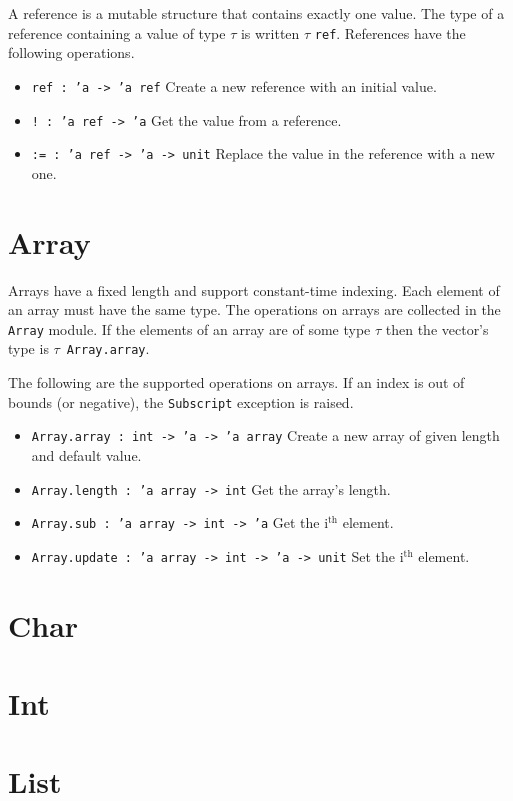 \documentclass[12pt,a4paper]{book}
\begin{document}
A reference is a mutable structure that contains exactly one value. The type of a reference containing a value of type $\tau$ is written $\tau$ \texttt{ref}.
References have the following operations.
\begin{itemize}
\item
\texttt{ref : 'a -> 'a ref} Create a new reference with an initial value.
\item
\texttt{! : 'a ref -> 'a} Get the value from a reference.
\item
\texttt{:= : 'a ref -> 'a -> unit} Replace the value in the reference with a new one.
\end{itemize}


\section{Array}

Arrays have a fixed length and support constant-time indexing. Each element of an array must have the same type. The operations on arrays are collected in the \texttt{Array} module. If the elements of an array are of some type $\tau$ then the vector's type is $\tau$\ \texttt{Array.array}.

The following are the supported operations on arrays. If an index is out of bounds (or negative), the \texttt{Subscript} exception is raised.
\begin{itemize}
\item \texttt{Array.array : int -> 'a -> 'a array} Create a new array of given length and default value.
\item \texttt{Array.length : 'a array -> int} Get the array's length.
\item \texttt{Array.sub : 'a array -> int -> 'a} Get the i$^\textrm{th}$ element.
\item \texttt{Array.update : 'a array -> int -> 'a -> unit} Set the i$^\textrm{th}$ element.
\end{itemize}

\section{Char}

\section{Int}

\section{List}
\end{document}
